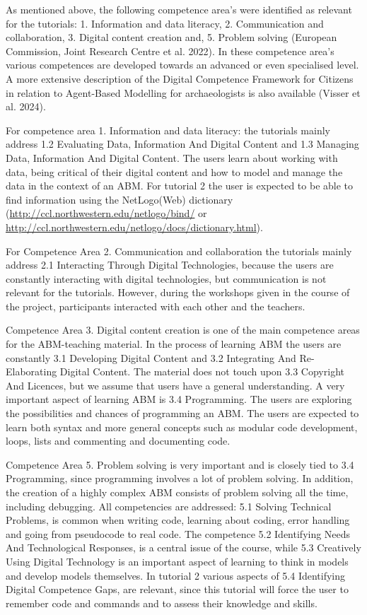 \documentclass[
]{article}
\begin{document}
As mentioned above, the following competence area's were identified as relevant for the tutorials: 1. Information and data literacy, 2. Communication and collaboration, 3. Digital content creation and, 5. Problem solving (European Commission, Joint Research Centre et al. 2022). In these competence area's various competences are developed towards an advanced or even specialised level. A more extensive description of the Digital Competence Framework for Citizens in relation to Agent-Based Modelling for archaeologists is also available (Visser et al. 2024).

For competence area 1. Information and data literacy: the tutorials mainly address 1.2 Evaluating Data, Information And Digital Content and 1.3 Managing Data, Information And Digital Content. The users learn about working with data, being critical of their digital content and how to model and manage the data in the context of an ABM. For tutorial 2 the user is expected to be able to find information using the NetLogo(Web) dictionary (\url{http://ccl.northwestern.edu/netlogo/bind/} or \url{http://ccl.northwestern.edu/netlogo/docs/dictionary.html}).

For Competence Area 2. Communication and collaboration the tutorials mainly address 2.1 Interacting Through Digital Technologies, because the users are constantly interacting with digital technologies, but communication is not relevant for the tutorials. However, during the workshops given in the course of the project, participants interacted with each other and the teachers.

Competence Area 3. Digital content creation is one of the main competence areas for the ABM-teaching material. In the process of learning ABM the users are constantly 3.1 Developing Digital Content and 3.2 Integrating And Re-Elaborating Digital Content. The material does not touch upon 3.3 Copyright And Licences, but we assume that users have a general understanding. A very important aspect of learning ABM is 3.4 Programming. The users are exploring the possibilities and chances of programming an ABM. The users are expected to learn both syntax and more general concepts such as modular code development, loops, lists and commenting and documenting code.

Competence Area 5. Problem solving is very important and is closely tied to 3.4 Programming, since programming involves a lot of problem solving. In addition, the creation of a highly complex ABM consists of problem solving all the time, including debugging. All competencies are addressed: 5.1 Solving Technical Problems, is common when writing code, learning about coding, error handling and going from pseudocode to real code. The competence 5.2 Identifying Needs And Technological Responses, is a central issue of the course, while 5.3 Creatively Using Digital Technology is an important aspect of learning to think in models and develop models themselves. In tutorial 2 various aspects of 5.4 Identifying Digital Competence Gaps, are relevant, since this tutorial will force the user to remember code and commands and to assess their knowledge and skills.
\end{document}
